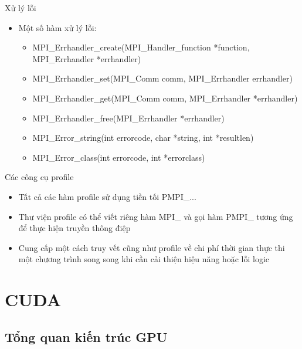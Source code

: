\documentclass[10pt]{beamer}
\theoremstyle{remark}
\numberwithin{algocf}{section}
\numberwithin{equation}{section}
\numberwithin{dl}{section}
\numberwithin{figure}{section}
\begin{document}
\begin{frame}{Xử lý lỗi}
    \begin{itemize}
        \item Một số hàm xử lý lỗi:
        \begin{itemize}
            \item MPI\_Errhandler\_create(MPI\_Handler\_function *function,
                                          MPI\_Errhandler *errhandler) 
            \item MPI\_Errhandler\_set(MPI\_Comm comm, MPI\_Errhandler errhandler) 
            \item MPI\_Errhandler\_get(MPI\_Comm comm, MPI\_Errhandler *errhandler)
            \item MPI\_Errhandler\_free(MPI\_Errhandler *errhandler)
            \item MPI\_Error\_string(int errorcode, char *string, int *resultlen)
            \item MPI\_Error\_class(int errorcode, int *errorclass)
        \end{itemize}
    \end{itemize}
\end{frame}

\begin{frame}{Các công cụ profile}
    \begin{itemize}
        \item Tất cả các hàm profile sử dụng tiền tối PMPI\_... 
        \item Thư viện profile có thể viết riêng hàm MPI\_ và gọi hàm PMPI\_ tương ứng để thực hiện truyền thông điệp
        \item Cung cấp một cách truy vết cũng như profile về chi phí thời gian thực thi một chương trình song song khi cần cải thiện hiệu năng hoặc lỗi logic
    \end{itemize}
\end{frame}

\section{CUDA}

\subsection{Tổng quan kiến trúc GPU}
\end{document}
